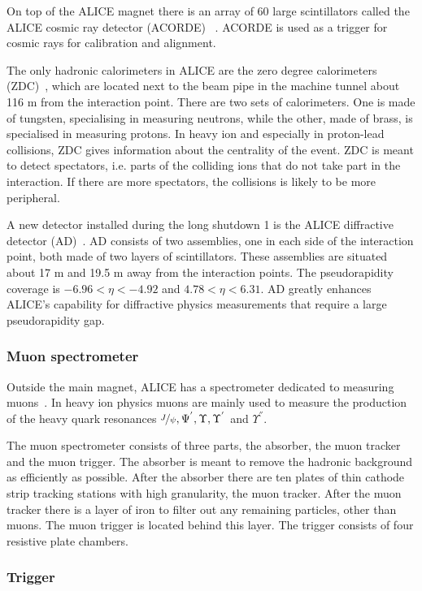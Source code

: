 On top of the ALICE magnet there is an array of 60 large scintillators called the ALICE cosmic ray detector (ACORDE) ~\cite{acorde}. ACORDE is used as a trigger for cosmic rays for calibration and alignment. 

The only hadronic calorimeters in ALICE are the zero degree calorimeters (ZDC)~\cite{zdc}, which are located next to the beam pipe in the machine tunnel about 116 m from the interaction point. There are two sets of calorimeters. One is made of tungsten, specialising in measuring neutrons, while the other, made of brass, is specialised in measuring protons. In heavy ion and especially in proton-lead collisions, ZDC gives information about the centrality of the event. ZDC is meant to detect spectators, i.e. parts of the colliding ions that do not take part in the interaction. If there are more spectators, the collisions is likely to be more peripheral.

A new detector installed during the long shutdown 1 is the ALICE diffractive detector (AD)~\cite{AD}. AD consists of two assemblies, one in each side of the interaction point, both made of two layers of scintillators. These assemblies are situated about 17 m and 19.5 m away from the interaction points. The pseudorapidity coverage is $-6.96 < \eta < -4.92 $ and $4.78 < \eta < 6.31$. AD greatly enhances ALICE's capability for diffractive physics measurements that require a large pseudorapidity gap.

\subsubsection{Muon spectrometer}
Outside the main magnet, ALICE has a spectrometer dedicated to measuring muons~\cite{MuonSpectro}. In heavy ion physics muons are mainly used to measure the production of the heavy quark resonances $\nicefrac{J}{\psi}, \Psi^{'}, \Upsilon, \Upsilon^{'}$ and $\Upsilon^{''}$.

The muon spectrometer consists of three parts, the absorber, the muon tracker and the muon trigger. The absorber is meant to remove the hadronic background as efficiently as possible. After the absorber there are ten plates of thin cathode strip tracking stations with high granularity, the muon tracker. After the muon tracker there is a layer of iron to filter out any remaining particles, other than muons. The muon trigger is located behind this layer. The trigger consists of four resistive plate chambers. 
\subsubsection{Trigger}
